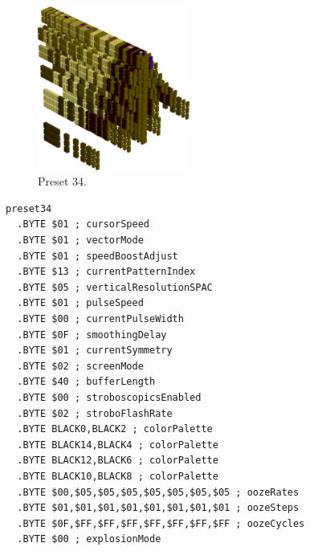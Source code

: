 \begin{minipage}[b]{0.48\linewidth}
\begin{figure}[H]                                                          
  \centering                                                             
  \begin{adjustbox}{width=5cm,center}                                   
  \includegraphics[width=5cm]{src/colorspace_presets/preset34-45.png}%
  \end{adjustbox}                                                        
\caption*{Preset 34.}                                           
\end{figure}                                                               
\end{minipage}
\hspace{0.1cm}
\begin{minipage}[b]{0.48\linewidth}                                       
\begin{lstlisting}[basicstyle=\ttfamily\tiny]
preset34
  .BYTE $01 ; cursorSpeed
  .BYTE $01 ; vectorMode
  .BYTE $01 ; speedBoostAdjust
  .BYTE $13 ; currentPatternIndex
  .BYTE $05 ; verticalResolutionSPAC
  .BYTE $01 ; pulseSpeed
  .BYTE $00 ; currentPulseWidth
  .BYTE $0F ; smoothingDelay
  .BYTE $01 ; currentSymmetry
  .BYTE $02 ; screenMode
  .BYTE $40 ; bufferLength
  .BYTE $00 ; stroboscopicsEnabled
  .BYTE $02 ; stroboFlashRate
  .BYTE BLACK0,BLACK2 ; colorPalette
  .BYTE BLACK14,BLACK4 ; colorPalette
  .BYTE BLACK12,BLACK6 ; colorPalette
  .BYTE BLACK10,BLACK8 ; colorPalette
  .BYTE $00,$05,$05,$05,$05,$05,$05,$05 ; oozeRates
  .BYTE $01,$01,$01,$01,$01,$01,$01,$01 ; oozeSteps
  .BYTE $0F,$FF,$FF,$FF,$FF,$FF,$FF,$FF ; oozeCycles
  .BYTE $00 ; explosionMode
\end{lstlisting}
\end{minipage}

